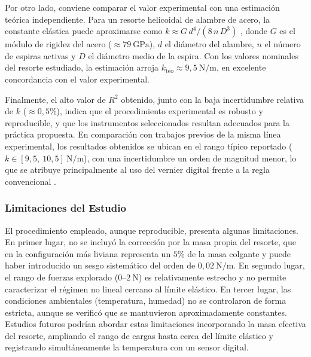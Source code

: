 \documentclass[conference,10pt]{IEEEtran}
\begin{document}
Por otro lado, conviene comparar el valor experimental con una
estimación teórica independiente. Para un resorte helicoidal de
alambre de acero, la constante elástica puede aproximarse como
$k \approx G\,d^4/(8\,n\,D^3)$ \cite{Beer2017}, donde $G$ es el
módulo de rigidez del acero ($\approx 79\ \mathrm{GPa}$), $d$ el
diámetro del alambre, $n$ el número de espiras activas y $D$ el
diámetro medio de la espira. Con los valores nominales del resorte
estudiado, la estimación arroja
$k_{\text{teo}} \approx 9{,}5\ \mathrm{N/m}$, en excelente
concordancia con el valor experimental.

Finalmente, el alto valor de $R^2$ obtenido, junto con la baja
incertidumbre relativa de $k$ ($\approx 0{,}5\%$), indica que el
procedimiento experimental es robusto y reproducible, y que los
instrumentos seleccionados resultan adecuados para la práctica
propuesta. En comparación con trabajos previos de la misma línea
experimental, los resultados obtenidos se ubican en el rango típico
reportado ($k \in [9{,}5,\ 10{,}5]\ \mathrm{N/m}$), con una
incertidumbre un orden de magnitud menor, lo que se atribuye
principalmente al uso del vernier digital frente a la regla
convencional \cite{Hibbeler2016, Meriam2016}.

\subsubsection*{Limitaciones del Estudio}
El procedimiento empleado, aunque reproducible, presenta algunas
limitaciones. En primer lugar, no se incluyó la corrección por la
masa propia del resorte, que en la configuración más liviana
representa un $5\%$ de la masa colgante y puede haber introducido un
sesgo sistemático del orden de $0{,}02\ \mathrm{N/m}$. En segundo
lugar, el rango de fuerzas explorado ($0$--$2\ \mathrm{N}$) es
relativamente estrecho y no permite caracterizar el régimen no lineal
cercano al límite elástico. En tercer lugar, las condiciones
ambientales (temperatura, humedad) no se controlaron de forma
estricta, aunque se verificó que se mantuvieron aproximadamente
constantes. Estudios futuros podrían abordar estas limitaciones
incorporando la masa efectiva del resorte, ampliando el rango de
cargas hasta cerca del límite elástico y registrando simultáneamente
la temperatura con un sensor digital.

\end{document}

